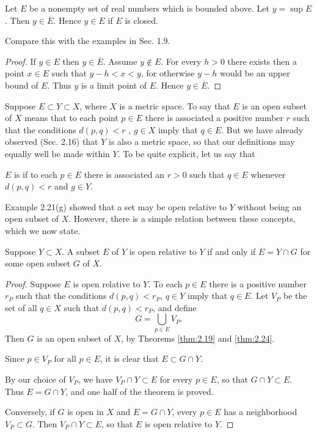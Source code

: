 \begin{thm}
    \label{thm:2.28}
    Let $E$ be a nonempty set of real numbers which is bounded above.     Let $y = \sup E$. Then $y \in \overline{E}$. Hence $y \in E$ if $E$ is closed.
\end{thm}
Compare this with the examples in Sec. 1.9.
\begin{proof}
    If $y \in E$ then $y \in \overline{E}$. 
    Assume $y \not\in E$. 
    For every $h > 0$ there exists then a point $x \in E$ 
    such that $y - h < x < y$, 
    for otherwise $y - h$ would be an upper bound of $E$. 
    Thus $y$ is a limit point of $E$. Hence $y \in \overline{E}$.
\end{proof}

\begin{myRemark}
    Suppose $E \subset Y \subset X$, where $X$ is a metric space. To say that $E$ is an open subset of $X$ means that to each point $p \in E$ there is associated a positive number $r$ such that the conditions $d(p,q) < r$ , $g \in X$ imply that $q \in E$. But we have already observed (Sec. 2.16) that $Y$ is also a metric space, so that our definitions may equally well be made within $Y$. To be quite explicit, let us say that 
    
    $E$ is  if to each $p \in E$ there is associated an $r > 0$ such that $q \in E$ whenever $d(p,q) <r$ and $g \in Y$. 
    
    Example 2.21(g) showed that a set may be open relative to $Y$ without being an open subset of $X$. However, there is a simple relation between these concepts, which we now state.
\end{myRemark}

\begin{thm}
    \label{thm:2.30}
    Suppose $Y \subset X$. A subset $E$ of $Y$ is open relative to $Y$ if and only if $E = Y \cap G$ for some open subset $G$ of $X$.
\end{thm}
\begin{proof}
    Suppose $E$ is open relative to $Y$. 
    To each $p \in E$ there is a positive number $r_P$ 
    such that the conditions $d(p, q) < r_P$, 
    $q \in Y$ imply that $q \in E$. 
    Let $V_P$ be the set of all $q \in X$ 
    such that $d(p, q) < r_P$, and define
    \begin{equation*}
        G = \bigcup_{p \in E} V_P.
    \end{equation*}
    Then $G$ is an open subset of $X$, by Theorems \ref{thm:2.19} and \ref{thm:2.24}. 

    Since $p \in V_P$ for all $p \in E$, 
    it is clear that $E \subset G \cap Y$.
    
    By our choice of $V_P$, 
    we have $V_P \cap Y \subset E$ for every $p \in E$, 
    so that $G \cap Y \subset E$. 
    Thus $E = G \cap Y$, and one half of the theorem is proved.
    
    Conversely, if $G$ is open in $X$ and $E = G \cap Y$, 
    every $p \in E$ has a neighborhood $V_P \subset G$. 
    Then $V_P \cap Y \subset E$, 
    so that $E$ is open relative to $Y$.
\end{proof}